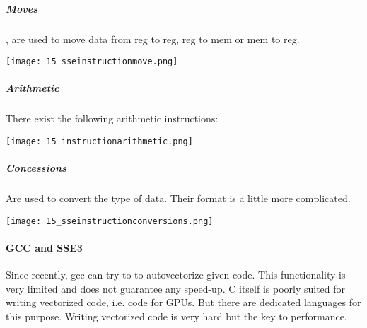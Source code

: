 \subparagraph{Moves}
,  are used to move data from reg to reg, reg to mem or mem to reg.

\texttt{[image: 15\_sseinstructionmove.png]}

\subparagraph{Arithmetic}
There exist the following arithmetic instructions:

\texttt{[image: 15\_instructionarithmetic.png]}

\subparagraph{Concessions}
Are used to convert the type of data. Their format is a little more complicated.

\texttt{[image: 15\_sseinstructionconversions.png]}

\paragraph{GCC and SSE3}
Since recently, gcc can try to to autovectorize given code. This functionality is very limited and does not guarantee any speed-up. C itself is poorly suited for writing vectorized code, i.e. code for GPUs. But there are dedicated languages for this purpose. Writing vectorized code is very hard but the key to performance.
